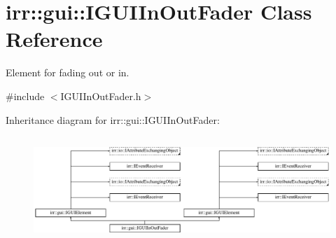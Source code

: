 \hypertarget{classirr_1_1gui_1_1IGUIInOutFader}{}\section{irr\+:\+:gui\+:\+:I\+G\+U\+I\+In\+Out\+Fader Class Reference}
\label{classirr_1_1gui_1_1IGUIInOutFader}


Element for fading out or in.  




{\ttfamily \#include $<$I\+G\+U\+I\+In\+Out\+Fader.\+h$>$}

Inheritance diagram for irr\+:\+:gui\+:\+:I\+G\+U\+I\+In\+Out\+Fader\+:\begin{figure}[H]
\begin{center}
\leavevmode
\includegraphics[height=4.038462cm]{classirr_1_1gui_1_1IGUIInOutFader}
\end{center}
\end{figure}
